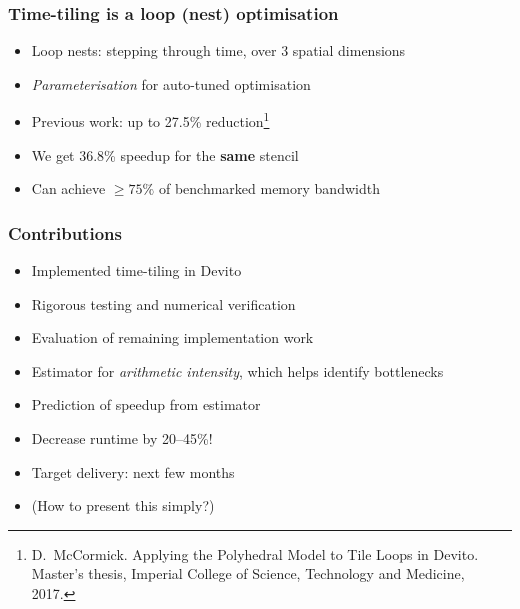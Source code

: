 \documentclass{beamer}
\begin{document}
%



\begin{frame}
\frametitle{Time-tiling is a loop (nest) optimisation}

\begin{itemize}
	\item Loop nests: stepping through time, over 3 spatial dimensions
	\item \emph{Parameterisation} for auto-tuned optimisation
	\item Previous work: up to 27.5\% reduction\footnote{D.~McCormick. Applying the Polyhedral Model to Tile Loops in Devito. Master's thesis, Imperial College of Science, Technology and Medicine, 2017.}
	\item We get 36.8\% speedup for the \textbf{same} stencil
	\item Can achieve \(\ge 75\%\) of benchmarked memory bandwidth
\end{itemize}
\end{frame}



\begin{frame}
\frametitle{Contributions}

\begin{itemize}
	\item Implemented time-tiling in Devito
	\item Rigorous testing and numerical verification
	\item Evaluation of remaining implementation work
	\item Estimator for \emph{arithmetic intensity}, which helps identify bottlenecks
	\item Prediction of speedup from estimator
	\item Decrease runtime by 20--45\%!
	\newline
	\item Target delivery: next few months
	\item (How to present this simply?)
\end{itemize}
\end{frame}
\end{document}
